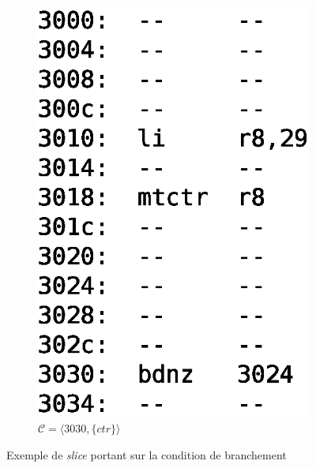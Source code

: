 \begin{figure}[ht]
\begin{subfigure}[t]{.20\textwidth}
        \includegraphics[scale=.4]{img/slice2.eps}
        \caption{$\mathcal{C} = \langle 3030, \{ ctr \} \rangle$}%
        \label{fig:slice2}
      \end{subfigure}
      \caption{Exemple de \emph{slice} portant sur la condition de branchement}
    \end{figure}

  

